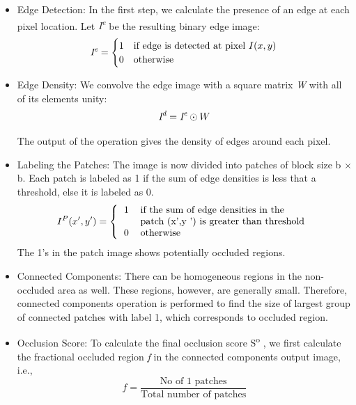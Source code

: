\documentclass{sig-alternate-05-2015}
\begin{document}
\begin{itemize}
\item  Edge Detection: In the first step, we calculate the presence of
an edge at each pixel location. Let \textit{I\textsuperscript{e}} be the resulting binary
edge image:\begin{equation}
 \textit{I\textsuperscript{e}}=\begin{cases} 
      1 & \text{if edge is detected at pixel } I(x, y) \\
      0 & \text{otherwise }
   \end{cases}
\end{equation}

\item Edge Density: We convolve the edge image with a square
matrix \textit{W} with all of its elements unity:\begin{equation} \textit{I\textsuperscript{d}}=\textit{I\textsuperscript{e}} \odot W
\end{equation}

The output of the operation gives the density of edges around each pixel.

\item Labeling the Patches: The image is now divided into patches of block size b $\times$ b. Each patch is labeled as 1 if the sum of edge densities is less that a threshold, else it is labeled as 0.\begin{equation}
 I^P(x',y')=
	\left\{ \begin{tabular}{c l}

 1 & \text{if the sum of edge densities in the }\\
       & patch (x',y ') \text{is greater than threshold} \\
        0 & \text{otherwise }

     \end{tabular} 
     \right.
\end{equation}
The 1's in the patch image shows potentially occluded regions.

\item  Connected Components: There can be homogeneous regions
in the non-occluded area as well. These regions, however, are
generally small. Therefore, connected components operation
is performed to find the size of largest group of connected
patches with label 1, which corresponds to occluded region.
\item Occlusion Score: To calculate the final occlusion score S\textsuperscript{o} ,
we first calculate the fractional occluded region \textit{f} in the connected components output image, i.e.,
\begin{equation}
f = \frac{\text{No of 1 patches}}  {\text{Total number of patches}}
\end{equation}
\end{itemize}
\end{document}
